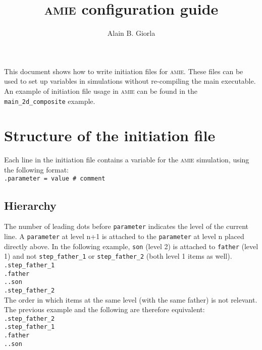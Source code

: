 \documentclass[10pt]{article}
\newcommand{\amie}{\textsc{amie}\xspace}
\begin{document}
\title{\amie configuration guide}
\author{Alain B. Giorla}

\maketitle

This document shows how to write initiation files for \amie. 
These files can be used to set up variables in simulations without re-compiling the main executable. 
An example of initiation file usage in \amie can be found in the \verb+main_2d_composite+ example.

\tableofcontents

\eject 

\section{Structure of the initiation file}

Each line in the initiation file contains a variable for the \amie simulation, using the following format:\\

\noindent \verb+.parameter = value # comment+\\

\subsection{Hierarchy}

The number of leading dots before \verb+parameter+ indicates the level of the current line.
A \verb+parameter+ at level n+1 is attached to the \verb+parameter+ at level n placed directly above.
In the following example, \verb+son+ (level 2) is attached to \verb+father+ (level 1) and not \verb+step_father_1+ or \verb+step_father_2+ (both level 1 items as well).\\

\noindent \verb+.step_father_1+\\
\verb+.father+\\
\verb+..son+\\
\verb+.step_father_2+\\

The order in which items at the same level (with the same father) is not relevant.
The previous example and the following are therefore equivalent:\\

\noindent \verb+.step_father_2+\\
\verb+.step_father_1+\\
\verb+.father+\\
\verb+..son+\\
\end{document}
